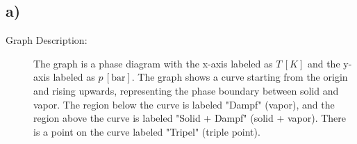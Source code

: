 

\subsection*{a)}

\begin{description}
    \item[Graph Description:] The graph is a phase diagram with the x-axis labeled as $T \, [K]$ and the y-axis labeled as $p \, [\text{bar}]$. The graph shows a curve starting from the origin and rising upwards, representing the phase boundary between solid and vapor. The region below the curve is labeled "Dampf" (vapor), and the region above the curve is labeled "Solid + Dampf" (solid + vapor). There is a point on the curve labeled "Tripel" (triple point).
\end{description}